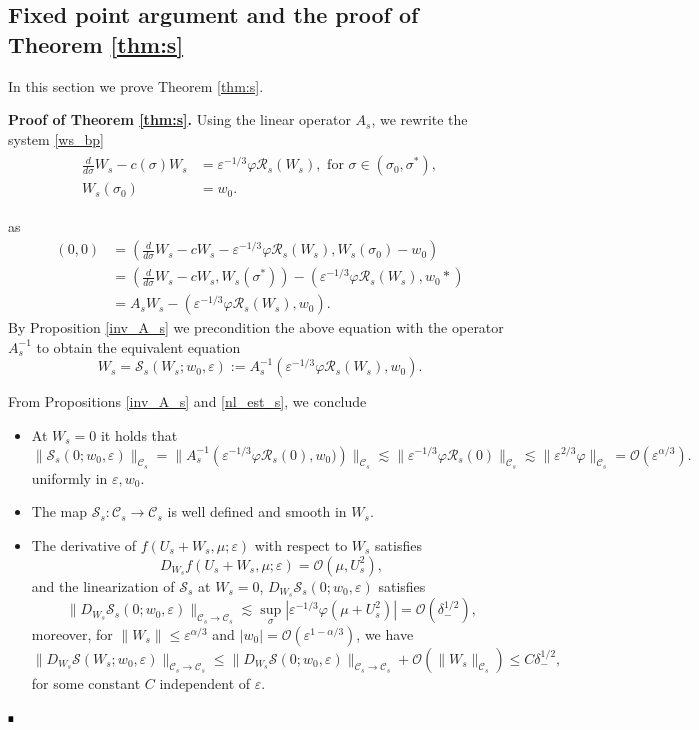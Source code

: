 \documentclass[letterpaper,11pt]{article}
\newcommand{\Ral}{\mathcal{R}}
\newcommand{\rmO}{\mathcal{O}}
\newcommand{\eps}{\varepsilon}
\newcommand{\lar}{ \lesssim }
\numberwithin{equation}{section}
\theoremstyle{plain}
\newenvironment{Proof}[1][.]%
 {\begin{trivlist}\item[]\textbf{Proof#1 }}%
 {\hspace*{\fill}$\rule{0.3\baselineskip}{0.35\baselineskip}$\end{trivlist}}
\begin{document}
\subsection{Fixed point argument and the proof of Theorem \ref{thm:s}}
In this section we prove Theorem \ref{thm:s}.
\begin{Proof}[ of Theorem \ref{thm:s}.]
Using the linear operator $A_s$, we rewrite the system \eqref{ws_bp}
\begin{align*}
\begin{split}
\frac{d}{d\sigma} W_s - c(\sigma)W_s &= \eps^{-1/3}\varphi \Ral_s(W_s), \text{ for }\sigma \in (\sigma_0,\sigma^*),\\
W_s(\sigma_0) &= w_0.
\end{split}
\end{align*}

as \begin{align*}
(0,0) &=\left( \frac{d}{d\sigma}W_s-c W_s - \eps^{-1/3}\varphi \Ral_s(W_s), W_s(\sigma_0)-w_0 \right)\\
&=\left( \frac{d}{d\sigma}W_s-cW_s, W_s(\sigma^*) \right)- \left(\eps^{-1/3}\varphi \Ral_s(W_s), w_0* \right)\\
&= A_s W_s - \left(\eps^{-1/3}\varphi \Ral_s(W_s), w_0 \right).
\end{align*} 
By Proposition \ref{inv_A_s} we precondition the above equation with the operator $A_s^{-1}$ to obtain the equivalent equation
\begin{equation}\label{fix_pt:s}
 W_s = \mathcal{S}_s(W_s; w_0,\eps):= A_s^{-1}(\eps^{-1/3}\varphi \mathcal{R}_s(W_s), w_0).
\end{equation}

From Propositions \ref{inv_A_s} and \ref{nl_est_s}, we conclude 
\begin{itemize}
\item At $W_s =0 $ it holds that  
\[
\|\mathcal{S}_s(0; w_0,\eps) \|_{\mathcal{C}_s}= \|A_s^{-1}\left(\eps^{-1/3}\varphi \mathcal{R}_s(0),w_0)\right)\|_{\mathcal{C}_s}  \lar \|\eps^{-1/3}\varphi \Ral_s(0)\|_{\mathcal{C}_s} \lar \|\eps^{2/3}\varphi  \|_{\mathcal{C}_s}=\rmO(\eps^{\alpha/3}).
\]
uniformly in $\eps,w_0$.

\item The map $\mathcal{S}_s: \mathcal{C}_s \to \mathcal{C}_s$ is well defined and smooth in $W_s$.

\item The derivative of $f(U_s+W_s,\mu;\eps)$ with respect to $W_s$ satisfies \[
D_{W_s} f(U_s+W_s,\mu;\eps)=\rmO(\mu, U_s^2),
\] 
and the linearization of $\mathcal{S}_s$ at $W_s=0$, $D_{W_s} \mathcal{S}_s(0;w_0,\eps)$ satisfies
\[
\|D_{W_s} \mathcal{S}_{s}(0;w_0,\eps)\|_{\mathcal{C}_s \to\mathcal{C}_s} \lar \sup_{\sigma}|\eps^{-1/3}\varphi(\mu+U_s^2)| = \rmO(\delta_-^{1/2}),
\]
moreover, for $\|W_{s}\|\le \eps^{\alpha/3}$ and $|w_0| =\rmO(\eps^{1-\alpha/3})$, we have \[
\|D_{W_s}\mathcal{S}(W_s;w_0,\eps)\|_{\mathcal{C}_s  \to \mathcal{C}_s} \le  \|D_{W_s}\mathcal{S}(0;w_0,\eps)\|_{\mathcal{C}_s \to \mathcal{C}_s}+\rmO(\|W_s\|_{\mathcal{C}_s}) \le C\delta_-^{1/2},
\]
for some constant $C$ independent of $\eps$.
\end{itemize}


\end{Proof}
\end{document}
